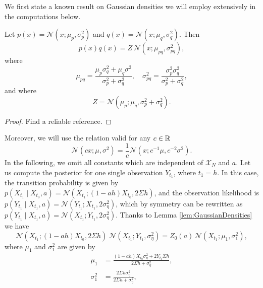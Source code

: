 \documentclass[10pt]{article}
\begin{document}
We first state a known result on Gaussian densities we will employ extensively in the computations below.
\begin{lemma}\label{lem:GaussianDensities} Let $p(x) = \mathcal N(x; \mu_p, \sigma^2_p)$ and $q(x) = \mathcal N(x; \mu_q, \sigma^2_q)$. Then
	\begin{equation}
		p(x) q(x) = Z \, \mathcal N(x; \mu_{pq}, \sigma^2_{pq}),
	\end{equation}
	where
	\begin{equation}
			\mu_{pq} = \frac{\mu_p \sigma^2_q + \mu_q \sigma^2}{\sigma^2_p + \sigma^2_q}, \quad \sigma^2_{pq} = \frac{\sigma^2_p \sigma^2_q}{\sigma^2_p + \sigma^2_q},
	\end{equation}
	and where
	\begin{equation}
		Z = \mathcal N(\mu_p; \mu_q, \sigma^2_p + \sigma^2_q).
	\end{equation}
\end{lemma}
\begin{proof} Find a reliable reference.
\end{proof}
Moreover, we will use the relation valid for any $c \in \mathbb{R}$ 
\begin{equation}\label{eq:GaussianConstant}
	\mathcal N(cx; \mu, \sigma^2) = \frac1c \mathcal N(x; c^{-1}\mu, c^{-2}\sigma^2). 
\end{equation}
In the following, we omit all constants which are independent of $\mathcal X_N$ and $a$. Let us compute the posterior for one single observation $Y_{t_1}$, where $t_1 = h$. In this case, the transition probability is given by $p(X_{t_1} \mid X_{t_0}, a) = \mathcal N(X_{t_1}; (1-ah)X_{t_0}, 2\Sigma h)$, and the observation likelihood is $p(Y_{t_1} \mid X_{t_1}, a) = \mathcal N(Y_{t_1}; X_{t_1}, 2\sigma_\eta^2)$, which by symmetry can be rewritten as
$p(Y_{t_1} \mid X_{t_1}, a) = \mathcal N(X_{t_1}; Y_{t_1}, 2\sigma_\eta^2)$. Thanks to Lemma \ref{lem:GaussianDensities} we have
\begin{equation}
	\mathcal N(X_{t_1}; (1-ah)X_{t_0}, 2\Sigma h) \; \mathcal N(X_{t_1}; Y_{t_1}, \sigma_\eta^2) = Z_0(a) \, \mathcal N(X_{t_1}; \mu_1, \sigma_1^2), 
\end{equation}
where $\mu_1$ and $\sigma_1^2$ are given by
\begin{equation}
\begin{aligned}
	\mu_1 &= \frac{(1-ah)X_{t_0} \sigma_\eta^2 + 2 Y_{t_1}\Sigma h}{2\Sigma h + \sigma_\eta^2},\\
	\sigma_1^2 &= \frac{2\Sigma h \sigma_\eta^2}{2\Sigma h + \sigma_\eta^2}, 
\end{aligned}
\end{equation}
\end{document}
